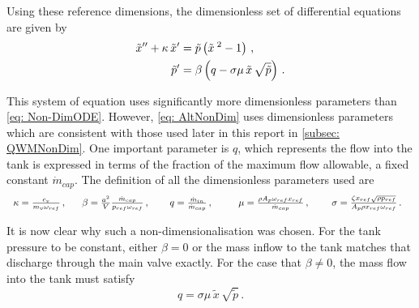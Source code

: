 Using these reference dimensions, the dimensionless set of differential equations are given by
~
\begin{equation} \label{eq: AltNonDim}
\begin{split}
    \tilde{x}{''} + \kappa \, \tilde{x}{'} &=  \tilde{p} \left( \tilde{x}^{\;2}  - 1 \right) \, , \\
    \tilde{p}{'} &= \beta \left( q - \sigma \mu \, \tilde{x} \, \sqrt{\tilde{p}} \right) \, .
\end{split}
\end{equation}

This system of equation uses significantly more dimensionless parameters than \cref{eq: Non-DimODE}. However, \cref{eq: AltNonDim} uses dimensionless parameters which are consistent with those used later in this report in \cref{subsec: QWMNonDim}. One important parameter is $q$, which represents the flow into the tank is expressed in terms of the fraction of the maximum flow allowable, a fixed constant $\dot{m}_{cap}$. The definition of all the dimensionless parameters used are
~
\begin{equation*}
    \begin{tabular}{p{2.1cm} p{2.8cm} p{2.1cm} p{3cm} p{2.8cm}}
        $ \kappa = \frac{c_v}{m_v \omega_{ref}} \, , $
        &
        $ \beta = \frac{a^2}{V} \frac{\dot{m}_{cap}}{p_{ref} \omega_{ref}} \, , $
        &
        $ q = \frac{\dot{m}_{in}}{\dot{m}_{cap}} \, , $
        &
        $ \mu = \frac{\rho A_p \omega_{ref} x_{ref}}{\dot{m}_{cap}} \, , $
        &
        $ \sigma = \frac{\zeta x_{ref} \sqrt{\rho p_{ref}}}{A_p \rho x_{ref} \omega_{ref}} \, . $
    \end{tabular}
\end{equation*}

It is now clear why such a non-dimensionalisation was chosen. For the tank pressure to be constant, either $\beta = 0$ or the mass inflow to the tank matches that discharge through the main valve exactly. For the case that $\beta \neq 0$, the mass flow into the tank must satisfy
~
\begin{equation*}
    q = \sigma \mu \, \tilde{x} \, \sqrt{\tilde{p}} \, .
\end{equation*}

